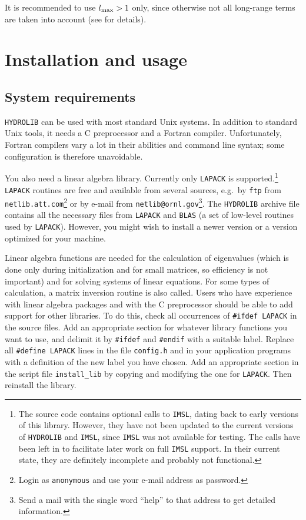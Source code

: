 \documentclass[12pt]{article}
\newcommand{\prog}[1]{{\tt #1}}
\begin{document}
It is recommended to use $l_{\rm max} > 1$ only, since otherwise not
all long-range terms are taken into account (see \cite{cifehiwabl} for
details).


\section{Installation and usage}

\subsection{System requirements}

\prog{HYDROLIB} can be used with most standard Unix systems.
In addition to standard Unix tools, it needs a C preprocessor and a
Fortran compiler. Unfortunately, Fortran compilers vary a lot in their
abilities and command line syntax; some configuration is therefore
unavoidable.

You also need a linear algebra library. Currently only \prog{LAPACK}
is supported.\footnote{The source code contains optional calls to
\prog{IMSL}, dating back to early versions of this library.  However,
they have not been updated to the current versions of
\prog{HYDROLIB} and \prog{IMSL}, since \prog{IMSL} was not
available for testing. The calls have been left in to facilitate later
work on full \prog{IMSL} support. In their current state, they are
definitely incomplete and probably not functional.} \prog{LAPACK}
routines are free and available from several sources, e.g.\ by
\prog{ftp} from \prog{netlib.att.com}\footnote{Login as
\prog{anonymous} and use your e-mail address as password.} or by e-mail
from \prog{netlib@ornl.gov}\footnote{Send a mail with the single word
``help'' to that address to get detailed information.}. The \prog{HYDROLIB}
archive file contains all the necessary files from \prog{LAPACK} and
\prog{BLAS} (a set of low-level routines used by \prog{LAPACK}).
However, you might wish to install a newer version or a version optimized
for your machine.

Linear algebra functions are needed for the calculation of eigenvalues
(which is done only during initialization and for small matrices, so
efficiency is not important) and for solving systems of linear
equations. For some types of calculation, a matrix inversion routine
is also called. Users who have experience with linear algebra packages
and with the C preprocessor should be able to add support for other
libraries. To do this, check all occurrences of
\prog{\#ifdef LAPACK} in the source files. Add an appropriate
section for whatever library functions you want to use, and delimit it
by \prog{\#ifdef} and \prog{\#endif} with a suitable label. Replace
all \prog{\#define LAPACK} lines in the file \prog{config.h} and in
your application programs with a definition of the new label you have
chosen. Add an appropriate section in the script file \prog{install\_lib}
by copying and modifying the one for \prog{LAPACK}. Then reinstall the
library.
\end{document}
